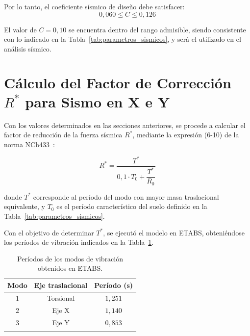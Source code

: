 Por lo tanto, el coeficiente sísmico de diseño debe satisfacer:
\begin{equation}
    0{,}060 \leq C \leq 0{,}126
\end{equation}

El valor de $C = 0{,}10$ se encuentra dentro del rango admisible, siendo consistente 
con lo indicado en la Tabla~\ref{tab:parametros_sismicos}, y será el utilizado en 
el análisis sísmico.

\section{Cálculo del Factor de Corrección $R^*$ para Sismo en X e Y}

Con los valores determinados en las secciones anteriores, se procede a calcular el 
factor de reducción de la fuerza sísmica $R^*$, mediante la expresión (6-10) de la 
norma NCh433~\cite{NCh433:1996}:

\begin{equation}
    R^* = \frac{T^*}{0{,}1 \cdot T_0 + \dfrac{T^*}{R_0}}
\end{equation}

donde $T^*$ corresponde al período del modo con mayor masa traslacional equivalente, 
y $T_0$ es el período característico del suelo definido en la 
Tabla~\ref{tab:parametros_sismicos}.

Con el objetivo de determinar $T^*$, se ejecutó el modelo en ETABS, obteniéndose los períodos de 
vibración indicados en la Tabla~\ref{tab:periodos}.

\begin{table}[H]
    \centering
    \caption{Períodos de los modos de vibración obtenidos en ETABS.}
    \label{tab:periodos}
    \begin{tabular}{ccc}
        \toprule
        \textbf{Modo} & \textbf{Eje traslacional} & \textbf{Período (s)} \\
        \midrule
        1 & Torsional & $1{,}251$ \\
        2 & Eje X     & $1{,}140$ \\
        3 & Eje Y     & $0{,}853$ \\
        \bottomrule
        \vspace{0.001cm}
    \end{tabular}

\end{table}

